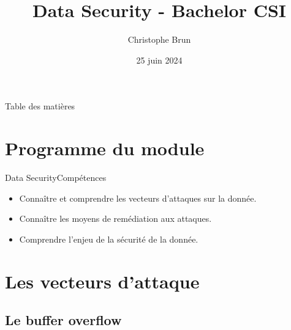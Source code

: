 \documentclass{beamer}
\title{Data Security - Bachelor CSI}
\author{Christophe Brun}
\institute{Campus Saint-Michel IT}
\date{25 juin 2024}
\begin{document}
    \begin{frame}
        \titlepage
    \end{frame}

    \begin{frame}{Table des matières}
        \tableofcontents
    \end{frame}


    \section{Programme du module}\label{sec:programme-du-module}
    \begin{frame}{Data Security}{Compétences}
        \begin{itemize}
            \item Connaître et comprendre les vecteurs d'attaques sur la donnée.
            \item Connaître les moyens de remédiation aux attaques.
            \item Comprendre l'enjeu de la sécurité de la donnée.
        \end{itemize}
    \end{frame}


    \section{Les vecteurs d'attaque}\label{sec:les-vecteurs-dattaque}

    \subsection{Le buffer overflow}\label{subsec:les-buffer-overflow}
\end{document}
